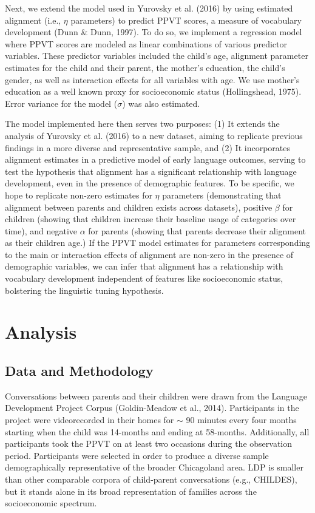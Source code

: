 \documentclass[10pt, letterpaper]{article}
\begin{document}
Next, we extend the model used in Yurovsky et al. (2016) by using
estimated alignment (i.e., \(\eta\) parameters) to predict PPVT scores,
a measure of vocabulary development (Dunn \& Dunn, 1997). To do so, we
implement a regression model where PPVT scores are modeled as linear
combinations of various predictor variables. These predictor variables
included the child's age, alignment parameter estimates for the child
and their parent, the mother's education, the child's gender, as well as
interaction effects for all variables with age. We use mother's
education as a well known proxy for socioeconomic status (Hollingshead,
1975). Error variance for the model (\(\sigma\)) was also estimated.

The model implemented here then serves two purposes: (1) It extends the
analysis of Yurovsky et al. (2016) to a new dataset, aiming to replicate
previous findings in a more diverse and representative sample, and (2)
It incorporates alignment estimates in a predictive model of early
language outcomes, serving to test the hypothesis that alignment has a
significant relationship with language development, even in the presence
of demographic features. To be specific, we hope to replicate non-zero
estimates for \(\eta\) parameters (demonstrating that alignment between
parents and children exists across datasets), positive \(\beta\) for
children (showing that children increase their baseline usage of
categories over time), and negative \(\alpha\) for parents (showing that
parents decrease their alignment as their children age.) If the PPVT
model estimates for parameters corresponding to the main or interaction
effects of alignment are non-zero in the presence of demographic
variables, we can infer that alignment has a relationship with
vocabulary development independent of features like socioeconomic
status, bolstering the linguistic tuning hypothesis.

\hypertarget{analysis}{%
\section{Analysis}\label{analysis}}

\hypertarget{data-and-methodology}{%
\subsection{Data and Methodology}\label{data-and-methodology}}

Conversations between parents and their children were drawn from the
Language Development Project Corpus (Goldin-Meadow et al., 2014).
Participants in the project were videorecorded in their homes for
\(\sim\) 90 minutes every four months starting when the child was
14-months and ending at 58-months. Additionally, all participants took
the PPVT on at least two occasions during the observation period.
Participants were selected in order to produce a diverse sample
demographically representative of the broader Chicagoland area. LDP is
smaller than other comparable corpora of child-parent conversations
(e.g., CHILDES), but it stands alone in its broad representation of
families across the socioeconomic spectrum.
\end{document}
